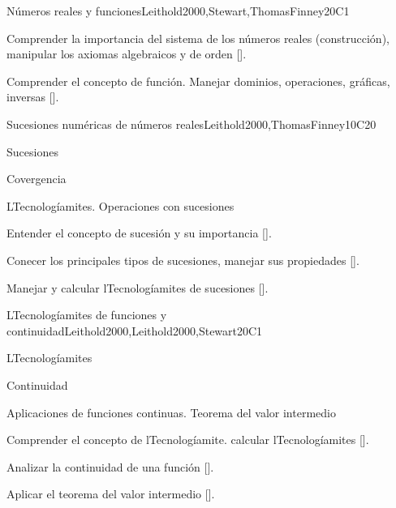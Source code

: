 \begin{syllabus}
\begin{unit}{}{Números reales y funciones}{Leithold2000,Stewart,ThomasFinney}{20}{C1}
   \begin{learningoutcomes}
      \item Comprender la importancia del sistema de los números reales (construcción), manipular los axiomas algebraicos y de orden [\Assessment].
      \item Comprender el concepto de función. Manejar dominios, operaciones, gráficas, inversas [\Assessment].
      \end{learningoutcomes}
\end{unit}

\begin{unit}{}{Sucesiones numéricas de números reales}{Leithold2000,ThomasFinney}{10}{C20}
   \begin{topics}
      \item Sucesiones
      \item Covergencia
      \item LTecnologíamites. Operaciones con sucesiones
   \end{topics}

   \begin{learningoutcomes}
      \item Entender el concepto de sucesión y su importancia [\Assessment].
      \item Conecer los principales tipos de sucesiones, manejar sus propiedades [\Assessment].
      \item Manejar y calcular lTecnologíamites de sucesiones [\Assessment].
      \end{learningoutcomes}
\end{unit}

\begin{unit}{}{LTecnologíamites de funciones y continuidad}{Leithold2000,Leithold2000,Stewart}{20}{C1}
   \begin{topics}
      \item LTecnologíamites
      \item Continuidad
      \item Aplicaciones de funciones continuas. Teorema del valor intermedio
   \end{topics}

   \begin{learningoutcomes}
      \item Comprender el concepto de lTecnologíamite. calcular lTecnologíamites [\Assessment].
      \item Analizar la continuidad de una función [\Assessment].
      \item Aplicar el teorema del valor intermedio [\Assessment].
      \end{learningoutcomes}
\end{unit}


\end{syllabus}
